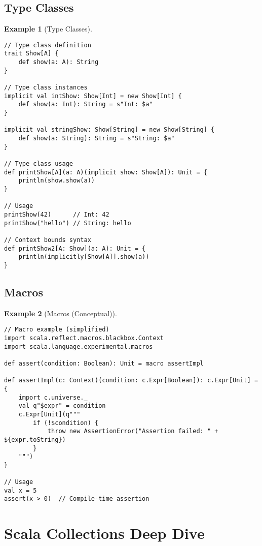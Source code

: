 \documentclass[11pt]{article}
\newtheorem{example}{Example}[section]
\begin{document}
\subsection{Type Classes}

\begin{example}[Type Classes]
\begin{lstlisting}
// Type class definition
trait Show[A] {
    def show(a: A): String
}

// Type class instances
implicit val intShow: Show[Int] = new Show[Int] {
    def show(a: Int): String = s"Int: $a"
}

implicit val stringShow: Show[String] = new Show[String] {
    def show(a: String): String = s"String: $a"
}

// Type class usage
def printShow[A](a: A)(implicit show: Show[A]): Unit = {
    println(show.show(a))
}

// Usage
printShow(42)      // Int: 42
printShow("hello") // String: hello

// Context bounds syntax
def printShow2[A: Show](a: A): Unit = {
    println(implicitly[Show[A]].show(a))
}
\end{lstlisting}
\end{example}

\subsection{Macros}

\begin{example}[Macros (Conceptual)]
\begin{lstlisting}
// Macro example (simplified)
import scala.reflect.macros.blackbox.Context
import scala.language.experimental.macros

def assert(condition: Boolean): Unit = macro assertImpl

def assertImpl(c: Context)(condition: c.Expr[Boolean]): c.Expr[Unit] = {
    import c.universe._
    val q"$expr" = condition
    c.Expr[Unit](q"""
        if (!$condition) {
            throw new AssertionError("Assertion failed: " + ${expr.toString})
        }
    """)
}

// Usage
val x = 5
assert(x > 0)  // Compile-time assertion
\end{lstlisting}
\end{example}

\section{Scala Collections Deep Dive}
\end{document}
